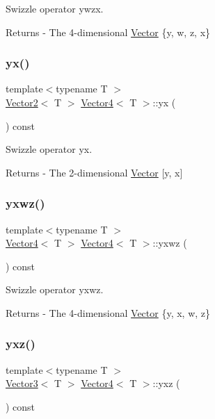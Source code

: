 Swizzle operator ywzx. \begin{DoxyReturn}{Returns}
-\/ The 4-\/dimensional \mbox{\hyperlink{class_vector}{Vector}} \{y, w, z, x\} 
\end{DoxyReturn}
\mbox{\label{class_vector4_a06f881777d4f9732865873fabf2a0205}} 
\subsubsection{\texorpdfstring{yx()}{yx()}}
{\footnotesize\ttfamily template$<$typename T $>$ \\
\mbox{\hyperlink{class_vector2}{Vector2}}$<$ T $>$ \mbox{\hyperlink{class_vector4}{Vector4}}$<$ T $>$\+::yx (\begin{DoxyParamCaption}{ }\end{DoxyParamCaption}) const}

Swizzle operator yx. \begin{DoxyReturn}{Returns}
-\/ The 2-\/dimensional \mbox{\hyperlink{class_vector}{Vector}} \mbox{[}y, x\mbox{]} 
\end{DoxyReturn}
\mbox{\label{class_vector4_aa8b094a794505c18e41844d60f7e36e7}} 
\subsubsection{\texorpdfstring{yxwz()}{yxwz()}}
{\footnotesize\ttfamily template$<$typename T $>$ \\
\mbox{\hyperlink{class_vector4}{Vector4}}$<$ T $>$ \mbox{\hyperlink{class_vector4}{Vector4}}$<$ T $>$\+::yxwz (\begin{DoxyParamCaption}{ }\end{DoxyParamCaption}) const}

Swizzle operator yxwz. \begin{DoxyReturn}{Returns}
-\/ The 4-\/dimensional \mbox{\hyperlink{class_vector}{Vector}} \{y, x, w, z\} 
\end{DoxyReturn}
\mbox{\label{class_vector4_ac19d943d99e2eacd49a3fcf69b831c3e}} 
\subsubsection{\texorpdfstring{yxz()}{yxz()}}
{\footnotesize\ttfamily template$<$typename T $>$ \\
\mbox{\hyperlink{class_vector3}{Vector3}}$<$ T $>$ \mbox{\hyperlink{class_vector4}{Vector4}}$<$ T $>$\+::yxz (\begin{DoxyParamCaption}{ }\end{DoxyParamCaption}) const}

